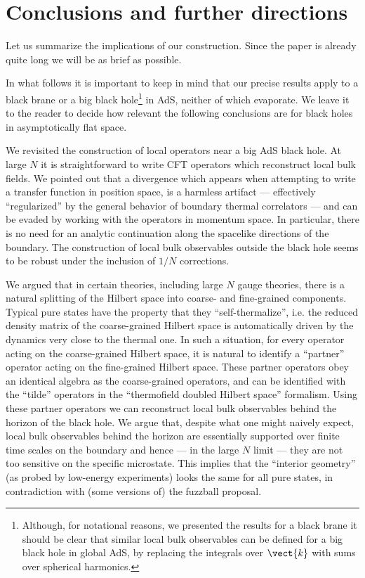 
\section{Conclusions and further directions \label{sec:conclusion}}

Let us summarize the implications of our construction. Since the paper is already quite long we will be as brief as possible. 

In what follows it is important to keep in mind
that our precise results apply to a black brane or a big black hole\footnote{Although, for notational reasons, we presented the results for a black brane it should be clear that similar local bulk observables
can be defined for a big black hole in global AdS, by replacing the integrals over $\vect{k}$ with sums over spherical harmonics.} in AdS, neither of which evaporate. We leave it to the reader to decide how relevant the following conclusions are for  black holes in asymptotically flat space.

\vskip5pt
We revisited the construction of local operators near a big AdS black hole. At large $N$ it is straightforward to write CFT operators which reconstruct local bulk fields. We pointed out that a divergence which appears when attempting to write a transfer function in position space, is a harmless artifact --- effectively ``regularized'' by the general behavior of boundary thermal correlators --- and can be evaded by working with the operators in momentum space. In particular, there is no need for an analytic continuation along the spacelike directions of the boundary. The construction of local bulk observables outside the black hole seems to be robust under the inclusion of $1/N$ corrections.

\vskip10pt

 We argued that in certain theories, including large $N$ gauge theories, there is a natural splitting of the Hilbert space into coarse- and fine-grained components. Typical pure states have the property that they ``self-thermalize'', i.e. the reduced density matrix of the coarse-grained Hilbert space is automatically driven by the dynamics very close to the thermal one. In such a situation, for every operator acting on the coarse-grained Hilbert space, it is natural to identify a ``partner'' operator acting on the fine-grained Hilbert space. These partner operators obey an identical algebra as the 
coarse-grained operators, and can be identified with the  ``tilde''  operators in the ``thermofield doubled Hilbert space'' formalism. Using these partner operators we can reconstruct local bulk observables behind the horizon of the black hole. We argue that, despite what one might naively expect,  local bulk observables behind the horizon are 
essentially supported over finite time scales on the boundary and hence --- in the large $N$ limit --- they are not too sensitive on the specific microstate. This implies that the ``interior geometry'' (as probed by low-energy experiments) looks the same for all pure states, in contradiction with (some versions of) the fuzzball proposal.

